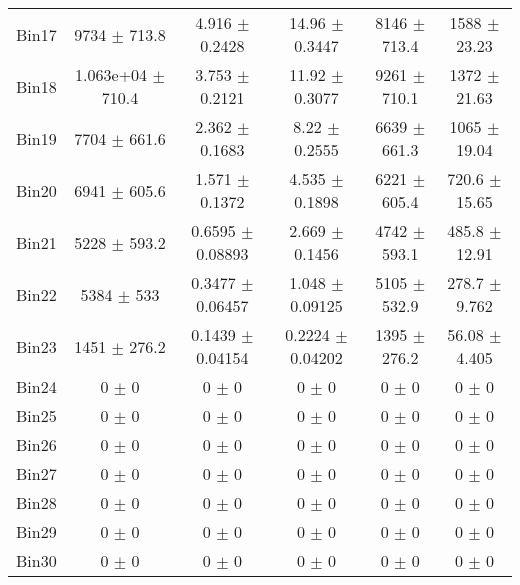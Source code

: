 \begin{tabular}{@{\extracolsep{4pt}}lccccc@{}}
     Bin17 & 9734 $\pm$ 713.8 & 4.916 $\pm$ 0.2428 & 14.96 $\pm$ 0.3447 & 8146 $\pm$ 713.4 & 1588 $\pm$ 23.23 \\ 
     Bin18 & 1.063e+04 $\pm$ 710.4 & 3.753 $\pm$ 0.2121 & 11.92 $\pm$ 0.3077 & 9261 $\pm$ 710.1 & 1372 $\pm$ 21.63 \\ 
     Bin19 & 7704 $\pm$ 661.6 & 2.362 $\pm$ 0.1683 & 8.22 $\pm$ 0.2555 & 6639 $\pm$ 661.3 & 1065 $\pm$ 19.04 \\ 
     Bin20 & 6941 $\pm$ 605.6 & 1.571 $\pm$ 0.1372 & 4.535 $\pm$ 0.1898 & 6221 $\pm$ 605.4 & 720.6 $\pm$ 15.65 \\ 
     Bin21 & 5228 $\pm$ 593.2 & 0.6595 $\pm$ 0.08893 & 2.669 $\pm$ 0.1456 & 4742 $\pm$ 593.1 & 485.8 $\pm$ 12.91 \\ 
     Bin22 & 5384 $\pm$ 533 & 0.3477 $\pm$ 0.06457 & 1.048 $\pm$ 0.09125 & 5105 $\pm$ 532.9 & 278.7 $\pm$ 9.762 \\ 
     Bin23 & 1451 $\pm$ 276.2 & 0.1439 $\pm$ 0.04154 & 0.2224 $\pm$ 0.04202 & 1395 $\pm$ 276.2 & 56.08 $\pm$ 4.405 \\ 
     Bin24 & 0 $\pm$ 0 & 0 $\pm$ 0 & 0 $\pm$ 0 & 0 $\pm$ 0 & 0 $\pm$ 0 \\ 
     Bin25 & 0 $\pm$ 0 & 0 $\pm$ 0 & 0 $\pm$ 0 & 0 $\pm$ 0 & 0 $\pm$ 0 \\ 
     Bin26 & 0 $\pm$ 0 & 0 $\pm$ 0 & 0 $\pm$ 0 & 0 $\pm$ 0 & 0 $\pm$ 0 \\ 
     Bin27 & 0 $\pm$ 0 & 0 $\pm$ 0 & 0 $\pm$ 0 & 0 $\pm$ 0 & 0 $\pm$ 0 \\ 
     Bin28 & 0 $\pm$ 0 & 0 $\pm$ 0 & 0 $\pm$ 0 & 0 $\pm$ 0 & 0 $\pm$ 0 \\ 
     Bin29 & 0 $\pm$ 0 & 0 $\pm$ 0 & 0 $\pm$ 0 & 0 $\pm$ 0 & 0 $\pm$ 0 \\ 
     Bin30 & 0 $\pm$ 0 & 0 $\pm$ 0 & 0 $\pm$ 0 & 0 $\pm$ 0 & 0 $\pm$ 0 \\ 
\hline\hline
  \end{tabular}

